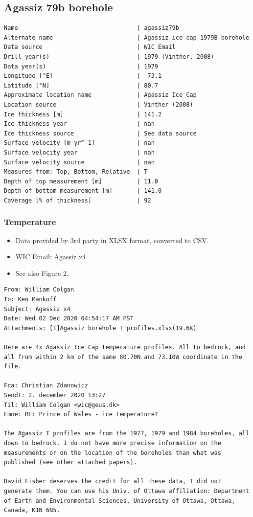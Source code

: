 \documentclass[article,a4paper,times,11pt,twoside]{article}
\begin{document}
\subsection{Agassiz 79b borehole}
\label{sec:org6088199}
\begin{verbatim}
Name                                  | agassiz79b
Alternate name                        | Agassiz ice cap 1979B borehole
Data source                           | WIC Email
Drill year(s)                         | 1979 (Vinther, 2008)
Data year(s)                          | 1979
Longitude [°E]                        | -73.1
Latitude [°N]                         | 80.7
Approximate location name             | Agassiz Ice Cap
Location source                       | Vinther (2008)
Ice thickness [m]                     | 141.2
Ice thickness year                    | nan
Ice thickness source                  | See data source
Surface velocity [m yr^-1]            | nan
Surface velocity year                 | nan
Surface velocity source               | nan
Measured from: Top, Bottom, Relative  | T
Depth of top measurement [m]          | 11.0
Depth of bottom measurement [m]       | 141.0
Coverage [% of thickness]             | 92
\end{verbatim}

\subsubsection{Temperature}
\label{sec:orgf748264}

\begin{itemize}
\item Data provided by 3rd party in XLSX format, converted to CSV.
\item WIC Email: \href{msgid:AM0PR04MB6129DE88C9253A951702EE06A2F30@AM0PR04MB6129.eurprd04.prod.outlook.com}{Agassiz x4}
\item See also \textcite{clarke_1987_wind} Figure 2.
\end{itemize}

\begin{verbatim}
From: William Colgan
To: Ken Mankoff
Subject: Agassiz x4
Date: Wed 02 Dec 2020 04:54:17 AM PST
Attachments: [1]Agassiz borehole T profiles.xlsx(19.6K)

Here are 4x Agassiz Ice Cap temperature profiles. All to bedrock, and
all from within 2 km of the same 80.70N and 73.10W coordinate in the
file.

Fra: Christian Zdanowicz
Sendt: 2. december 2020 13:27
Til: William Colgan <wic@geus.dk>
Emne: RE: Prince of Wales - ice temperature?

The Agassiz T profiles are from the 1977, 1979 and 1984 boreholes, all
down to bedrock. I do not have more precise information on the
measurements or on the location of the boreholes than what was
published (see other attached papers).

David Fisher deserves the credit for all these data, I did not
generate them. You can use his Univ. of Ottawa affiliation: Department
of Earth and Environmental Sciences, University of Ottawa, Ottawa,
Canada, K1N 6N5.
\end{verbatim}
\end{document}

